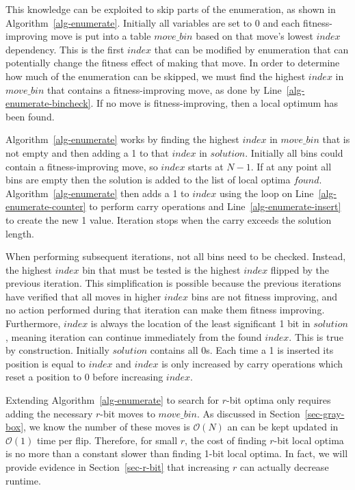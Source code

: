 \documentclass[runningheads,a4paper]{llncs}
\newcommand{\BigO}[1]{$\mathcal{O}{(#1)}$}
\begin{document}
This knowledge can be exploited to skip parts of the enumeration,
as shown in Algorithm~\ref{alg-enumerate}.
Initially all variables are set to 0 and
each fitness-improving move is put into a table $move\_bin$
based on that move's lowest $index$ dependency. This is the first $index$ that
can be modified by enumeration that can potentially change the fitness effect of making that move.
In order to determine how much of the enumeration can be skipped, we must find
the highest $index$ in $move\_bin$ that contains a fitness-improving move,
as done by Line~\ref{alg-enumerate-bincheck}. If no move is fitness-improving,
then a local optimum has been found.

Algorithm~\ref{alg-enumerate} works by finding the highest $index$ in $move\_bin$
that is not empty and then adding a 1 to that $index$ in $solution$. Initially
all bins could contain a fitness-improving move, so $index$ starts at $N-1$.
If at any point all bins are empty then the solution is added to the list of
local optima $found$. Algorithm~\ref{alg-enumerate} then
adds a 1 to $index$ using the loop on Line~\ref{alg-enumerate-counter}
to perform carry operations and Line~\ref{alg-enumerate-insert} to create the new 1 value.
Iteration stops when the carry exceeds the solution length.

When performing subsequent iterations, not all bins need to be checked. Instead, the highest $index$
bin that must be tested is the highest $index$ flipped by the previous iteration. This
simplification is possible because
the previous iterations have verified that all moves in higher $index$ bins are not fitness improving, and no action performed during
that iteration can make them fitness improving.
Furthermore, $index$ is always the location of the least significant 1 bit in $solution$, meaning
iteration can continue immediately from the found $index$. This is true by construction.
Initially $solution$ contains all 0s. Each time a 1 is inserted its position is equal to $index$ and
$index$ is only increased by carry operations which reset a position to 0 before increasing $index$.

Extending Algorithm~\ref{alg-enumerate} to search for $r$-bit optima only requires adding the
necessary $r$-bit moves to $move\_bin$. As discussed in Section~\ref{sec-gray-box}, we know the number of these moves
is \BigO{N} an can be kept updated in \BigO{1} time per flip. Therefore, for small $r$, the cost
of finding $r$-bit local optima is no more than a constant slower than finding 1-bit local optima.
In fact, we will provide evidence in Section~\ref{sec-r-bit} that increasing $r$ can actually
decrease runtime.
\end{document}
